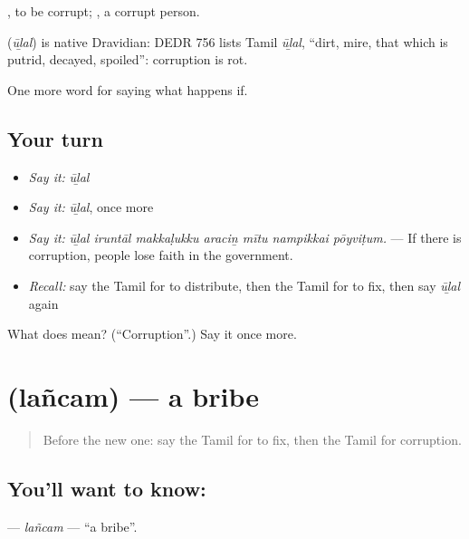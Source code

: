  , to be corrupt; , a corrupt person.

\begin{cousinweb}
\textbf{} (\emph{ūḻal}) is native Dravidian: DEDR 756 lists Tamil \emph{ūḻal}, \textquotedblleft{}dirt, mire, that which is putrid, decayed, spoiled\textquotedblright{}: corruption is rot.
\end{cousinweb}

\begin{grammarlens}[title={What you've built}]
One more word for saying what happens if.
\end{grammarlens}

\subsection*{Your turn}
\begin{itemize}
\raggedright
  \item \emph{Say it:} \emph{ūḻal}
  \item \emph{Say it:} \emph{ūḻal}, once more
  \item \emph{Say it:} \emph{ūḻal iruntāl makkaḷukku araciṉ mītu nampikkai pōyviṭum.} — If there is corruption, people lose faith in the government.
  \item \emph{Recall:} say the Tamil for to distribute, then the Tamil for to fix, then say \emph{ūḻal} again
\end{itemize}

\begin{tcolorbox}[breakable,colback=teal!4,colframe=teal!35!black,title={Before you move on}]
What does  mean? (\textquotedblleft{}Corruption\textquotedblright{}.) Say it once more.
\end{tcolorbox}
\section[\texorpdfstring{\ta{லஞ்சம்} (lañcam)}{லஞ்சம் (lañcam)}]{ (lañcam) — a bribe}

\label{lesson:TA-C392-lancam}



\begin{quote}
Before the new one: say the Tamil for to fix, then the Tamil for corruption.
\end{quote}

\subsection*{You'll want to know: }
\textbf{} — \emph{lañcam} — \textquotedblleft{}a bribe\textquotedblright{}.

